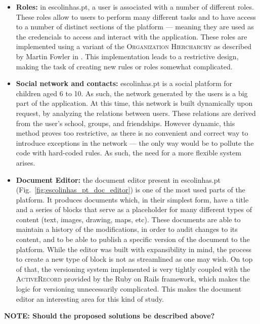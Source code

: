 \begin{itemize}
  \item \textbf{Roles:} in escolinhas.pt, a user is associated with a number of different roles. These roles allow to users to perform many different tasks and to have access to a number of distinct sections of the platform --- meaning they are used as the credencials to access and interact with the application. These roles are implemented using a variant of the \textsc{Organization Hiercharchy} as described by Martin Fowler in \cite{fowler_organization_hierarchy}. This implementation leads to a restrictive design, making the task of creating new rules or roles somewhat complicated. \\
  
  \item \textbf{Social network and contacts:} escolinhas.pt is a social platform for children aged 6 to 10. As such, the network generated by the users is a big part of the application. At this time, this network is built dynamically upon request, by analyzing the relations between users. These relations are derived from the user's school, groups, and friendships. However dynamic, this method proves too restrictive, as there is no convenient and correct way to introduce exceptions in the network --- the only way would be to pollute the code with hard-coded rules. As such, the need for a more flexible system arises. \\
  
  \item \textbf{Document Editor:} the document editor present in escolinhas.pt (Fig.~\ref{fig:escolinhas_pt_doc_editor}) is one of the most used parts of the platform. It produces documents which, in their simplest form, have a title and a series of blocks that serve as a placeholder for many different types of content (text, images, drawing, maps, etc). These documents are able to maintain a history of the modifications, in order to audit changes to its content, and to be able to publish a specific version of the document to the platform. While the editor was built with expansibility in mind, the process to create a new type of block is not as streamlined as one may wish. On top of that, the versioning system implemented is very tightly coupled with the \textsc{ActiveRecord} provided by the Ruby on Rails framework, which makes the logic for versioning unnecessarily complicated. This makes the document editor an interesting area for this kind of study. \\
\end{itemize}


\textbf{NOTE: Should the proposed solutions be described above?}

